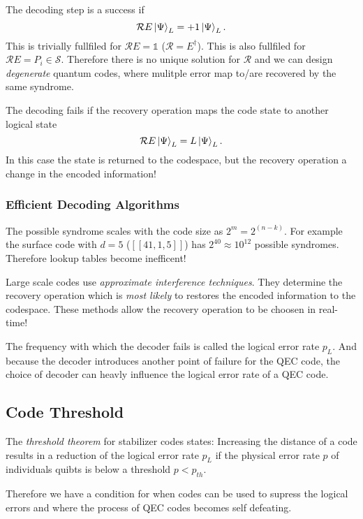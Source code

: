 The decoding step is a success if 
\begin{equation}
    \mathcal{R}E \ket{\Psi}_L = +1 \ket{\Psi}_L.
\end{equation}
This is trivially fullfiled for $\mathcal{R}E=\mathds{1}$ ($\mathcal{R}=E^\dagger$). 
This is also fullfiled for $\mathcal{R}E=P_i \in \mathcal{S}$.
Therefore there is no unique solution for $\mathcal{R}$ and we can design \textit{degenerate} quantum codes,
where mulitple error map to/are recovered by the same syndrome.

The decoding fails if the recovery operation maps the code state to another logical state
\begin{equation}
    \mathcal{R}E \ket{\Psi}_L = L\ket{\Psi}_L.
\end{equation}
In this case the state is returned to the codespace, 
but the recovery operation a change in the encoded information!

\subsubsection{Efficient Decoding Algorithms}

The possible syndrome scales with the code size as $2^m = 2^(n-k)$.
For example the surface code with $d=5$ ($[[41,1,5]]$) has $2^40\approx 10^12$ possible syndromes. 
Therefore lookup tables become inefficent!

Large scale codes use \textit{approximate interference techniques}.
They determine the recovery operation which is \textit{most likely} to restores the encoded information to the codespace.
These methods allow the recovery operation to be choosen in real-time!

The frequency with which the decoder fails is called the logical error rate $p_L$. 
And because the decoder introduces another point of failure for the QEC code, the choice of decoder can heavly influence the logical error rate of a QEC code. 

\subsection{Code Threshold}
The \textit{threshold theorem} for stabilizer codes states:
Increasing the distance of a code results in a reduction of the logical error rate $p_L$ 
if the physical error rate $p$ of individuals quibts is below a threshold $p<p_{th}$.

Therefore we have a condition for when codes can be used to supress the logical errors and where the process of QEC codes becomes self defeating.

